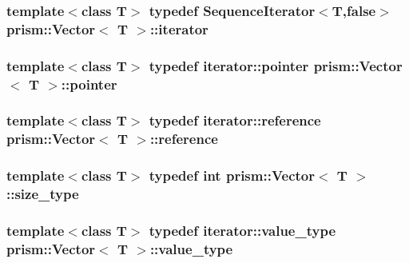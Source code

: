 \subsubsection[{\texorpdfstring{iterator}{iterator}}]{\setlength{\rightskip}{0pt plus 5cm}template$<$class T$>$ typedef {\bf Sequence\+Iterator}$<$T,false$>$ {\bf prism\+::\+Vector}$<$ T $>$\+::{\bf iterator}}\hypertarget{classprism_1_1_vector_aec3211503bad8800731cc3e08170592e}{}\label{classprism_1_1_vector_aec3211503bad8800731cc3e08170592e}
\subsubsection[{\texorpdfstring{pointer}{pointer}}]{\setlength{\rightskip}{0pt plus 5cm}template$<$class T$>$ typedef {\bf iterator\+::pointer} {\bf prism\+::\+Vector}$<$ T $>$\+::{\bf pointer}}\hypertarget{classprism_1_1_vector_a9823d64f361cdff3fcc5043e8b4bd882}{}\label{classprism_1_1_vector_a9823d64f361cdff3fcc5043e8b4bd882}
\subsubsection[{\texorpdfstring{reference}{reference}}]{\setlength{\rightskip}{0pt plus 5cm}template$<$class T$>$ typedef {\bf iterator\+::reference} {\bf prism\+::\+Vector}$<$ T $>$\+::{\bf reference}}\hypertarget{classprism_1_1_vector_a8ccf98342707efbed82918a44be97438}{}\label{classprism_1_1_vector_a8ccf98342707efbed82918a44be97438}
\subsubsection[{\texorpdfstring{size\+\_\+type}{size_type}}]{\setlength{\rightskip}{0pt plus 5cm}template$<$class T$>$ typedef int {\bf prism\+::\+Vector}$<$ T $>$\+::{\bf size\+\_\+type}}\hypertarget{classprism_1_1_vector_a14c909f500f13b8b7a276bb97ae746e8}{}\label{classprism_1_1_vector_a14c909f500f13b8b7a276bb97ae746e8}
\subsubsection[{\texorpdfstring{value\+\_\+type}{value_type}}]{\setlength{\rightskip}{0pt plus 5cm}template$<$class T$>$ typedef {\bf iterator\+::value\+\_\+type} {\bf prism\+::\+Vector}$<$ T $>$\+::{\bf value\+\_\+type}}\hypertarget{classprism_1_1_vector_a12f8585af6daa44e7732880b3f725ee3}{}\label{classprism_1_1_vector_a12f8585af6daa44e7732880b3f725ee3}


